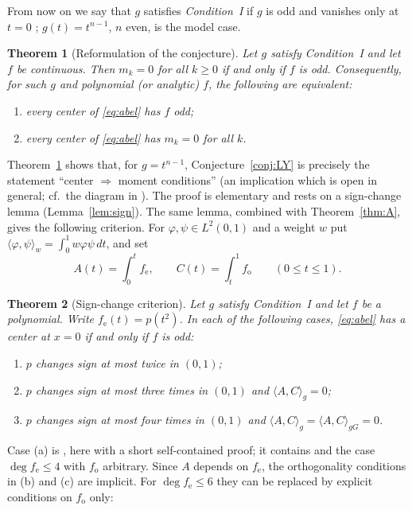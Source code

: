 \documentclass[11pt]{amsart}
\numberwithin{equation}{section}
\theoremstyle{plain}
\newtheorem{mainthm}{Theorem}
\theoremstyle{definition}
\theoremstyle{remark}
\newcommand{\fe}{f_{\mathrm e}}
\newcommand{\fo}{f_{\mathrm o}}
\newcommand{\ip}[2]{\langle #1,#2\rangle}
\begin{document}
From now on we say that $g$ satisfies \emph{Condition~I} if $g$ is odd and
vanishes only at $t=0$ \cite{ALA20}; $g(t)=t^{n-1}$, $n$ even, is the model case.

\begin{mainthm}[Reformulation of the conjecture]\label{thm:B}
Let $g$ satisfy Condition~I and let $f$ be continuous. Then $m_k=0$ for all
$k\ge0$ if and only if $f$ is odd. Consequently, for such $g$ and polynomial (or
analytic) $f$, the following are equivalent:
\begin{enumerate}[label=\textup{(\roman*)}]
\item every center of \eqref{eq:abel} has $f$ odd;
\item every center of \eqref{eq:abel} has $m_k=0$ for all $k$.
\end{enumerate}
\end{mainthm}

Theorem~\ref{thm:B} shows that, for $g=t^{n-1}$, Conjecture~\ref{conj:LY} is
precisely the statement ``center $\Rightarrow$ moment conditions'' (an implication
which is open in general; cf.\ the diagram in \cite[\S1.3]{ALA20}). The proof is
elementary and rests on a sign-change lemma (Lemma~\ref{lem:sign}). The same
lemma, combined with Theorem~\ref{thm:A}, gives the following criterion. For
$\varphi,\psi\in L^2(0,1)$ and a weight $w$ put
$\ip{\varphi}{\psi}_w=\int_0^1w\varphi\psi\,dt$, and set
\[
 A(t)=\int_0^t\fe,\qquad C(t)=\int_t^1\fo\qquad(0\le t\le1).
\]

\begin{mainthm}[Sign-change criterion]\label{thm:C}
Let $g$ satisfy Condition~I and let $f$ be a polynomial. Write $\fe(t)=p(t^2)$.
In each of the following cases, \eqref{eq:abel} has a center at $x=0$ if and only
if $f$ is odd:
\begin{enumerate}[label=\textup{(\alph*)}]
\item $p$ changes sign at most twice in $(0,1)$;
\item $p$ changes sign at most three times in $(0,1)$ and $\ip{A}{C}_g=0$;
\item $p$ changes sign at most four times in $(0,1)$ and
 $\ip{A}{C}_g=\ip{A}{C}_{gG}=0$.
\end{enumerate}
\end{mainthm}

Case (a) is \cite[Thm.~1.10]{ALA20}, here with a short self-contained proof; it
contains \cite[Thm.~1.12]{ALA20} and the case $\deg\fe\le4$ with $\fo$ arbitrary.
Since $A$ depends on $\fe$, the orthogonality conditions in (b) and (c) are
implicit. For $\deg\fe\le6$ they can be replaced by explicit conditions on
$\fo$ only:
\end{document}
